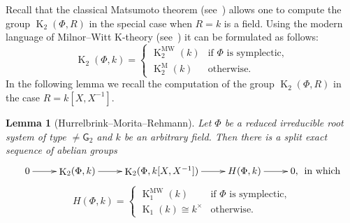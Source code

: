 \documentclass[oneside, 8pt]{amsart}
\newtheorem{lemma}{Lemma}
\theoremstyle{remark}
\theoremstyle{definition}
\numberwithin{lemma}{section}
\numberwithin{prop}{section}
\numberwithin{corollary}{section}
\numberwithin{externaltheorem}{section}
\DeclareMathOperator{\K}{K}
\newcommand{\inv}{^{-1}}
\newcommand{\rG}{\mathsf{G}}
\numberwithin{equation}{section}
\begin{document}
Recall that the classical Matsumoto theorem (see~\cite[Theorem~5.10]{Ma69}) allows one to compute the group $\K_2(\Phi, R)$ in the special case when $R=k$ is a field.
Using the modern language of Milnor--Witt K-theory (see~\cite{Mo04}) it can be formulated as follows:
\begin{equation*} \K_2(\Phi, k) = \left\{\begin{array}{ll} \K_2^\mathrm{MW}(k)& \text{if $\Phi$ is symplectic,}\\ \K_2^\mathrm{M}(k) & \text{otherwise.}\end{array}\right. \end{equation*}
In the following lemma we recall the computation of the group $\K_2(\Phi, R)$ in the case $R=k[X, X\inv]$.
\begin{lemma}[Hurrelbrink--Morita--Rehmann]\label{K2-laurent-field} Let $\Phi$ be a reduced irreducible root system of type $\neq \rG_2$ and $k$ be an arbitrary field. Then there is a split exact sequence of abelian groups
\[ \xymatrix{ 0 \ar[r] & \K_2(\Phi, k) \ar[r] & \K_2(\Phi, k[X, X^{-1}]) \ar[r] & H(\Phi, k) \ar[r] & 0,}\text{ in which} \]
\[ H(\Phi, k) = \left\{\begin{array}{ll} \K_1^\mathrm{MW}(k)& \text{if $\Phi$ is symplectic,}\\ \K_1(k) \cong k^\times & \text{otherwise.}  \end{array}\right. \]  \end{lemma}
\end{document}
